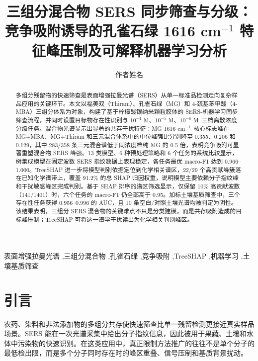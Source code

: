 \documentclass[preprint,12pt]{elsarticle}
\newcommand{\cmone}{cm$^{-1}$}
\newcommand{\molA}{$10^{-4}$ M}
\newcommand{\molB}{$10^{-5}$ M}
\newcommand{\molC}{$10^{-6}$ M}
\begin{document}
\begin{frontmatter}

\title{三组分混合物 SERS 同步筛查与分级：竞争吸附诱导的孔雀石绿 1616 \texorpdfstring{cm$^{-1}$}{cm-1} 特征峰压制及可解释机器学习分析}

\author[inst1]{作者姓名}

\begin{abstract}
多组分残留物的快速筛查是表面增强拉曼光谱（SERS）从单一标准品检测走向复杂样品应用的关键环节。本文以福美双（Thiram）、孔雀石绿（MG）和 4-巯基苯甲酸（4-MBA）三组分体系为对象，构建了基于柠檬酸银纳米颗粒胶体的 SERS-机器学习同步筛查流程，并同时设置目标物存在性识别与 \molA、\molB、\molC\ 三档离散浓度分级任务。混合物光谱显示出显著的共存干扰特征：MG 1616 \cmone\ 核心标志峰在 MG+MBA、MG+Thiram 和三元混合体系中的中位峰强比分别降至 0.355、0.206 和 0.129，其中 283/358 条三元混合谱低于同浓度档纯 MG 的 0.5 倍，表明竞争吸附可显著重塑混合物 SERS 峰强。13 类模型、6 种预处理策略和 6 个任务的系统比较显示，树集成模型在固定波数 SERS 指纹数据上表现稳定，各任务最优 macro-F1 达到 0.966--1.000。TreeSHAP 进一步将模型判别依据定位到化学相关谱区，22/29 个高贡献峰簇落在已知化学谱带上，覆盖 91.2\% 的总 SHAP 归因权重，说明模型主要依赖分子指纹峰和干扰敏感峰区完成判别。基于 SHAP 排序的谱区筛选显示，仅保留 10\% 高贡献波数（141/1401）时，六个任务的 macro-F1 仍全部高于 0.95。加标土壤基质筛查中，三个存在性任务获得 0.956--0.996 的 AUC，且 10 条空白/对照土壤光谱均被判定为阴性。该结果表明，三组分 SERS 混合物的关键难点不只是分类建模，而是共存吸附造成的目标峰压制；TreeSHAP 可将这一谱学干扰读出为化学相关判别峰区。
\end{abstract}

\begin{keyword}
表面增强拉曼光谱 \sep 三组分混合物 \sep 孔雀石绿 \sep 竞争吸附 \sep TreeSHAP \sep 机器学习 \sep 土壤基质筛查
\end{keyword}

\end{frontmatter}

\section{引言}

农药、染料和非法添加物的多组分共存使快速筛查比单一残留检测更接近真实样品场景。SERS 能在一次光谱采集中给出分子指纹信息，因此被用于果蔬、土壤和水体中污染物的快速识别\cite{HuApple,SMAMixture,SoilThiram}。在这类应用中，真正限制方法推广的往往不是单个分子的最低检出限，而是多个分子同时存在时的峰区重叠、信号压制和基质背景扰动。
\end{document}
